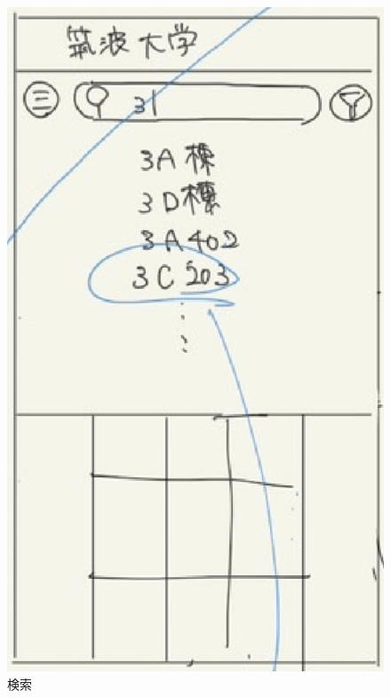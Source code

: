 \documentclass[12pt,a4paper,dvipdf]{jsarticle}
\begin{document}
\begin{figure}[H]
\begin{minipage}[b]{0.24\columnwidth}
        \includegraphics[width=0.9\columnwidth]{./img/検索.png}
        \caption{検索}
    \end{minipage}
\end{figure}
\end{document}
